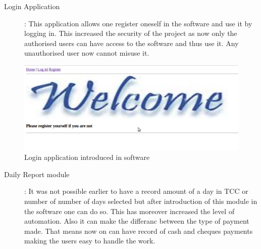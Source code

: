 \newpage
\begin{description}
\item[Login Application] : This application allows one register oneself in the software and use it by logging in. This increased the security of the project as now only the authorised users can have access to the software and thus use it. Any unauthorised user now cannot misuse it.
\end{description}
\begin{figure}[h]
\centering \includegraphics[scale=0.3]{Screenshot.png}
\caption{Login application introduced in software}
\end{figure}
\newpage
\begin{description}
\item[Daily Report module] : It was not possible earlier to have a record amount of a day in TCC or number of number of days selected but after introduction of this module in the software one can do so. This has moreover increased the level of automation.
Also it can make the differanc between the type of payment made. That means now on can have record of cash and cheques payments making the users easy to handle the work.
\end{description}


